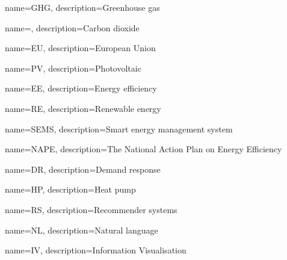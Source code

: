 \makeglossaries

{
    name=GHG,
    description={Greenhouse gas}
}

{
    name=,
    description={Carbon dioxide}
}

{
    name=EU,
    description={European Union}
}

{
    name=PV,
    description={Photovoltaic}
}

{
    name=EE,
    description={Energy efficiency}
}

{
    name=RE,
    description={Renewable energy}
}

{
    name=SEMS,
    description={Smart energy management system}
}

{
    name=NAPE,
    description={The National Action Plan on Energy Efficiency}
}

{
    name=DR,
    description={Demand response}
}

{
    name=HP,
    description={Heat pump}
}

{
    name=RS,
    description={Recommender systems}
}

{
    name=NL,
    description={Natural language}
}

{
    name=IV,
    description={Information Visualisation}
}